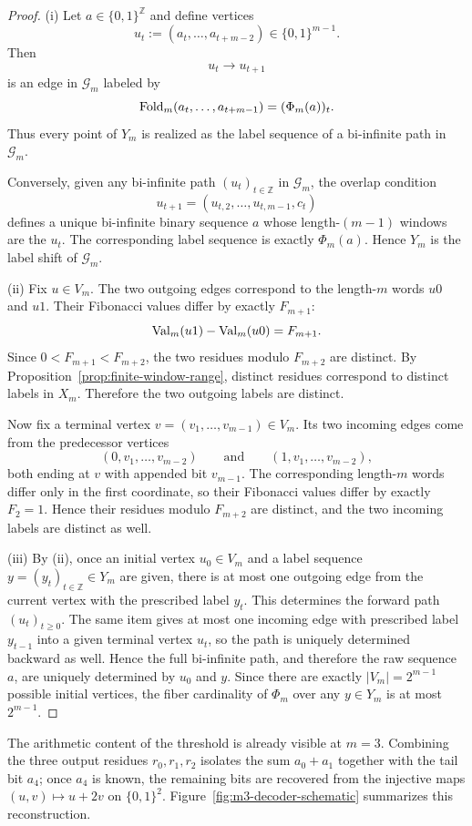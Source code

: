 \begin{proof}
(i) Let $a\in\{0,1\}^{\mathbb Z}$ and define vertices
\[
u_t:=(a_t,\dots,a_{t+m-2})\in\{0,1\}^{m-1}.
\]
Then
\[
u_t\to u_{t+1}
\]
is an edge in $\mathcal G_m$ labeled by
\[
\mathrm{Fold}_m(a_t,\dots,a_{t+m-1})=(\Phi_m(a))_t.
\]
Thus every point of $Y_m$ is realized as the label sequence of a bi-infinite path in $\mathcal G_m$.

Conversely, given any bi-infinite path $(u_t)_{t\in\mathbb Z}$ in $\mathcal G_m$, the overlap condition
\[
u_{t+1}=(u_{t,2},\dots,u_{t,m-1},c_t)
\]
defines a unique bi-infinite binary sequence $a$ whose length-$(m-1)$ windows are the $u_t$. The corresponding label sequence is exactly $\Phi_m(a)$. Hence $Y_m$ is the label shift of $\mathcal G_m$.

(ii) Fix $u\in V_m$. The two outgoing edges correspond to the length-$m$ words $u0$ and $u1$. Their Fibonacci values differ by exactly $F_{m+1}$:
\[
\mathrm{Val}_m(u1)-\mathrm{Val}_m(u0)=F_{m+1}.
\]
Since $0<F_{m+1}<F_{m+2}$, the two residues modulo $F_{m+2}$ are distinct. By Proposition~\ref{prop:finite-window-range}, distinct residues correspond to distinct labels in $X_m$. Therefore the two outgoing labels are distinct.

Now fix a terminal vertex $v=(v_1,\dots,v_{m-1})\in V_m$. Its two incoming edges come from the predecessor vertices
\[
(0,v_1,\dots,v_{m-2})
\qquad\text{and}\qquad
(1,v_1,\dots,v_{m-2}),
\]
both ending at $v$ with appended bit $v_{m-1}$. The corresponding length-$m$ words differ only in the first coordinate, so their Fibonacci values differ by exactly $F_2=1$. Hence their residues modulo $F_{m+2}$ are distinct, and the two incoming labels are distinct as well.

(iii) By (ii), once an initial vertex $u_0\in V_m$ and a label sequence $y=(y_t)_{t\in\mathbb Z}\in Y_m$ are given, there is at most one outgoing edge from the current vertex with the prescribed label $y_t$. This determines the forward path $(u_t)_{t\ge 0}$. The same item gives at most one incoming edge with prescribed label $y_{t-1}$ into a given terminal vertex $u_t$, so the path is uniquely determined backward as well. Hence the full bi-infinite path, and therefore the raw sequence $a$, are uniquely determined by $u_0$ and $y$. Since there are exactly $|V_m|=2^{m-1}$ possible initial vertices, the fiber cardinality of $\Phi_m$ over any $y\in Y_m$ is at most $2^{m-1}$.
\end{proof}

The arithmetic content of the threshold is already visible at $m=3$. Combining the three output residues $r_0,r_1,r_2$ isolates the sum $a_0+a_1$ together with the tail bit $a_4$; once $a_4$ is known, the remaining bits are recovered from the injective maps $(u,v)\mapsto u+2v$ on $\{0,1\}^2$. Figure~\ref{fig:m3-decoder-schematic} summarizes this reconstruction.

